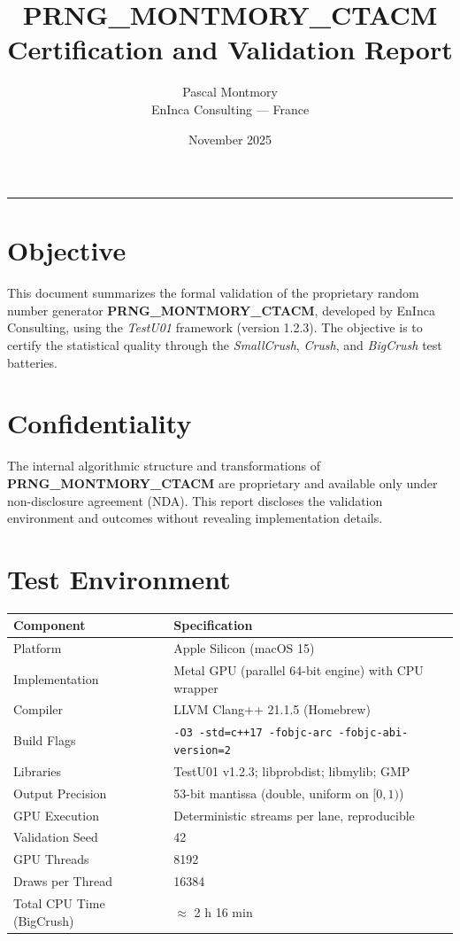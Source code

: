 \documentclass[11pt]{article}
\title{\textbf{PRNG\_MONTMORY\_CTACM}\\\large Certification and Validation Report}
\author{Pascal Montmory\\EnInca Consulting --- France}
\date{November 2025}
\begin{document}
\maketitle
\vspace{-0.5em}
\hrule
\vspace{1.0em}

\section*{Objective}
This document summarizes the formal validation of the proprietary random number generator \textbf{PRNG\_MONTMORY\_CTACM}, developed by EnInca Consulting, using the \textit{TestU01} framework (version 1.2.3). The objective is to certify the statistical quality through the \textit{SmallCrush}, \textit{Crush}, and \textit{BigCrush} test batteries.

\section*{Confidentiality}
The internal algorithmic structure and transformations of \textbf{PRNG\_MONTMORY\_CTACM} are proprietary and available only under non-disclosure agreement (NDA). This report discloses the validation environment and outcomes without revealing implementation details.

\section{Test Environment}
\begin{longtable}{@{}ll@{}}
\toprule
\textbf{Component} & \textbf{Specification} \\
\midrule
Platform & Apple Silicon (macOS 15) \\
Implementation & Metal GPU (parallel 64-bit engine) with CPU wrapper \\
Compiler & LLVM Clang++ 21.1.5 (Homebrew) \\
Build Flags & \texttt{-O3 -std=c++17 -fobjc-arc -fobjc-abi-version=2} \\
Libraries & TestU01 v1.2.3; libprobdist; libmylib; GMP \\
Output Precision & 53-bit mantissa (double, uniform on $[0,1)$) \\
GPU Execution & Deterministic streams per lane, reproducible \\
Validation Seed & 42 \\
GPU Threads & 8192 \\
Draws per Thread & 16384 \\
Total CPU Time (BigCrush) & $\approx$ 2 h 16 min \\
\bottomrule
\end{longtable}
\end{document}
